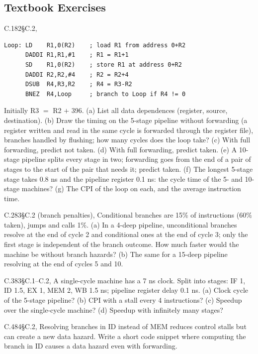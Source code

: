 \subsection{Textbook Exercises}
\label{sec:pipe-tbx}

\begin{tbexercise}[C]{C.1}{82}{\S C.2, }
\begin{lstlisting}
Loop: LD    R1,0(R2)    ; load R1 from address 0+R2
      DADDI R1,R1,#1    ; R1 = R1+1
      SD    R1,0(R2)    ; store R1 at address 0+R2
      DADDI R2,R2,#4    ; R2 = R2+4
      DSUB  R4,R3,R2    ; R4 = R3-R2
      BNEZ  R4,Loop     ; branch to Loop if R4 != 0
\end{lstlisting}
Initially R3 $=$ R2 $+$ 396. (a) List all data dependences (register, source,
destination). (b) Draw the timing on the 5-stage pipeline without forwarding (a
register written and read in the same cycle is forwarded through the register file),
branches handled by flushing; how many cycles does the loop take? (c) With full
forwarding, predict not taken. (d) With full forwarding, predict taken. (e) A 10-stage
pipeline splits every stage in two; forwarding goes from the end of a pair of stages
to the start of the pair that needs it; predict taken. (f) The longest 5-stage stage
takes 0.8 ns and the pipeline register 0.1 ns: the cycle time of the 5- and 10-stage
machines? (g) The CPI of the loop on each, and the average instruction time.
\end{tbexercise}

\begin{tbexercise}[C]{C.2}{83}{\S C.2 (branch penalties), }
Conditional branches are 15\% of instructions (60\% taken), jumps and calls 1\%.
(a) In a 4-deep pipeline, unconditional branches resolve at the end of cycle 2 and
conditional ones at the end of cycle 3; only the first stage is independent of the
branch outcome. How much faster would the machine be without branch hazards? (b) The
same for a 15-deep pipeline resolving at the end of cycles 5 and 10.
\end{tbexercise}

\begin{tbexercise}[C]{C.3}{83}{\S C.1--C.2, }
A single-cycle machine has a 7 ns clock. Split into stages: IF 1, ID 1.5, EX 1, MEM 2,
WB 1.5 ns; pipeline register delay 0.1 ns. (a) Clock cycle of the 5-stage pipeline?
(b) CPI with a stall every 4 instructions? (c) Speedup over the single-cycle machine?
(d) Speedup with infinitely many stages?
\end{tbexercise}

\begin{tbexercise}[C]{C.4}{84}{\S C.2, }
Resolving branches in ID instead of MEM reduces control stalls but can create a new
data hazard. Write a short code snippet where computing the branch in ID causes a
data hazard even with forwarding.
\end{tbexercise}

